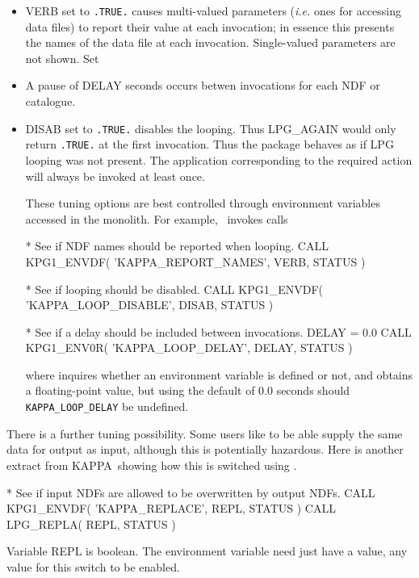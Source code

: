 \documentclass[twoside,11pt]{starlink}
\providecommand{\KAPPA}{{\footnotesize KAPPA}\normalsize}
\providecommand{\KAPPAref}{\xref{{\KAPPA}}{sun95}{}}
\begin{document}
\begin{itemize}

\item
VERB set to \texttt{.TRUE.} causes multi-valued parameters (\emph{i.e.}
ones for accessing data files) to report their value at each
invocation; in essence this presents the names of the data file at
each invocation.  Single-valued parameters are not shown.  Set

\item
A pause of DELAY seconds occurs betwen invocations for each NDF or
catalogue.

\item
DISAB set to \texttt{.TRUE.} disables the looping.  Thus LPG\_AGAIN
would only return \texttt{.TRUE.} at the first invocation.  Thus the
package behaves as if LPG looping was not present.
The application corresponding to the required action will always be
invoked at least once.

These tuning options are best controlled through environment variables
accessed in the monolith.  For example, \KAPPAref\ invokes
 calls

\begin{small}
\begin{terminalv}
*  See if NDF names should be reported when looping.
      CALL KPG1_ENVDF( 'KAPPA_REPORT_NAMES', VERB, STATUS )

*  See if looping should be disabled.
      CALL KPG1_ENVDF( 'KAPPA_LOOP_DISABLE', DISAB, STATUS )

*  See if a delay should be included between invocations.
      DELAY = 0.0
      CALL KPG1_ENV0R( 'KAPPA_LOOP_DELAY', DELAY, STATUS )
\end{terminalv}
\end{small}

where  inquires whether an environment
variable is defined or not, and 
obtains a floating-point value, but using the default of 0.0 seconds
should \texttt{KAPPA\_LOOP\_DELAY} be undefined.

\end{itemize}

There is a further tuning possibility.  Some users like to be able
supply the same data for output as input, although this is potentially
hazardous.  Here is another extract from \KAPPA\ showing how this
is switched using .

\begin{small}
\begin{terminalv}
*  See if input NDFs are allowed to be overwritten by output NDFs.
      CALL KPG1_ENVDF( 'KAPPA_REPLACE', REPL, STATUS )
      CALL LPG_REPLA( REPL, STATUS )
\end{terminalv}
\end{small}
Variable REPL is boolean.  The environment variable need just have a
value, any value for this switch to be enabled.
\end{document}

